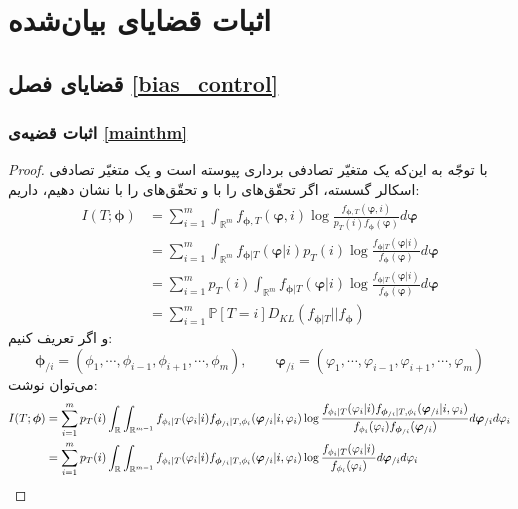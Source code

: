 \documentclass[a4paper,12pt]{article}
\newcommand{\Prob}{\mathbb{P}}
\newcommand{\bfphi}{\bm {\phi}}
\newcommand{\R}{\mathbb{R}}
\begin{document}
	\section{اثبات قضایای بیان‌شده}
	\subsection{قضایای فصل
		\ref{bias_control}}
	\subsubsection{اثبات قضیه‌ی
		\eqref{mainthm}}
	\begin{proof}
		با توجّه به این‌که
		یک متغیّر تصادفی برداری پیوسته است و 
		یک متغیّر تصادفی اسکالر گسسته، اگر تحقّق‌های
		\lr{$\bm{\phi}$}
		را با
		و تحقّق‌های
		را با
		نشان دهیم، داریم:
		\begin{align}
		I(T;\bm{\phi}) &= \sum_{i = 1}^{m} \int_{\R^m} f_{\bfphi,T}(\bm{\varphi},i)\log\frac{f_{\bfphi,T}(\bm{\varphi},i)}{p_T(i)f_{\bfphi}(\bm{\varphi})} d\bm{\varphi}\\
		&= \sum_{i = 1}^{m} \int_{\R^m} f_{\bfphi|T}(\bm{\varphi}|i) p_T(i) \log\frac{f_{\bfphi|T}(\bm{\varphi}|i)}{f_{\bfphi}(\bm{\varphi})} d\bm{\varphi}\\
		&= \sum_{i = 1}^{m} p_T(i) \int_{\R^m} f_{\bfphi|T}(\bm{\varphi}|i) \log\frac{f_{\bfphi|T}(\bm{\varphi}|i)}{f_{\bfphi}(\bm{\varphi})} d\bm{\varphi}\\
		&= \sum_{i = 1}^{m} \Prob[T=i]D_{KL}(f_{\bfphi|T}||f_{\bfphi})
		\end{align}
		و اگر تعریف کنیم:
		\[\bfphi_{/i} = (\phi_1,\cdots,\phi_{i-1},\phi_{i+1},\cdots,\phi_m),\qquad \bm{\varphi}_{/i} = (\varphi_1,\cdots,\varphi_{i-1},\varphi_{i+1},\cdots,\varphi_m)\]
		می‌توان نوشت:
		\begin{align}
		I(T;\bm{\phi}) &= \sum_{i = 1}^{m} p_T(i) \int_{\R}\int_{\R^{m-1}} f_{\phi_i|T}(\varphi_i|i) f_{\bfphi_{/i}|T,\phi_i}(\bm{\varphi}_{/i}|i,\varphi_i)  \log\frac{ f_{\phi_i|T}(\varphi_i|i) f_{\bfphi_{/i}|T,\phi_i}(\bm{\varphi}_{/i}|i,\varphi_i) }{f_{\phi_i}(\varphi_i) f_{\bm{\phi}_{/i}}(\bm{\varphi}_{/i})} d\bm{\varphi}_{/i}d\varphi_i\\
		&= \sum_{i = 1}^{m} p_T(i) \int_{\R}\int_{\R^{m-1}} f_{\phi_i|T}(\varphi_i|i)  f_{\bfphi_{/i}|T,\phi_i}(\bm{\varphi}_{/i}|i,\varphi_i)  \log\frac{f_{\phi_i|T}(\varphi_i|i)}{f_{\phi_i}(\varphi_i)} d\bm{\varphi}_{/i}d\varphi_i\notag\\

\end{align}
\end{proof}
\end{document}
